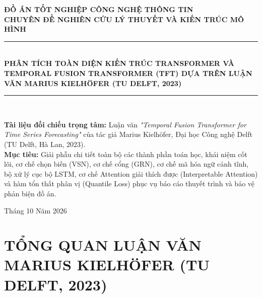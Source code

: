 \documentclass[12pt,a4paper,oneside]{article}
\begin{document}
\begin{titlepage}
    \centering
    \vspace*{0.5cm}
    {\Large \textbf{ĐỒ ÁN TỐT NGHIỆP CÔNG NGHỆ THÔNG TIN}}\\[0.3cm]
    {\large \textbf{CHUYÊN ĐỀ NGHIÊN CỨU LÝ THUYẾT VÀ KIẾN TRÚC MÔ HÌNH}}\\[1.2cm]
    
    \rule{\linewidth}{1.5pt}\\[0.4cm]
    {\LARGE \bfseries PHÂN TÍCH TOÀN DIỆN KIẾN TRÚC TRANSFORMER VÀ TEMPORAL FUSION TRANSFORMER (TFT) DỰA TRÊN LUẬN VĂN MARIUS KIELH\"{O}FER (TU DELFT, 2023)}\\[0.4cm]
    \rule{\linewidth}{1.5pt}\\[1.2cm]
    
    \begin{minipage}{0.92\textwidth}
        \textbf{Tài liệu đối chiếu trọng tâm:} Luận văn \textit{"Temporal Fusion Transformer for Time Series Forecasting"} của tác giả Marius Kielh\"{o}fer, Đại học Công nghệ Delft (TU Delft, Hà Lan, 2023).\\
        \textbf{Mục tiêu:} Giải phẫu chi tiết toàn bộ các thành phần toán học, khái niệm cốt lõi, cơ chế chọn biến (VSN), cơ chế cổng (GRN), cơ chế mã hóa ngữ cảnh tĩnh, bộ xử lý cục bộ LSTM, cơ chế Attention giải thích được (Interpretable Attention) và hàm tổn thất phân vị (Quantile Loss) phục vụ báo cáo thuyết trình và bảo vệ phản biện đồ án.
    \end{minipage}
    
    \vfill
    {\large Tháng 10 Năm 2026}
\end{titlepage}

\tableofcontents
\newpage

\section{TỔNG QUAN LUẬN VĂN MARIUS KIELH\"{O}FER (TU DELFT, 2023)}
\label{sec:tong_quan_kielhofer}
\end{document}
